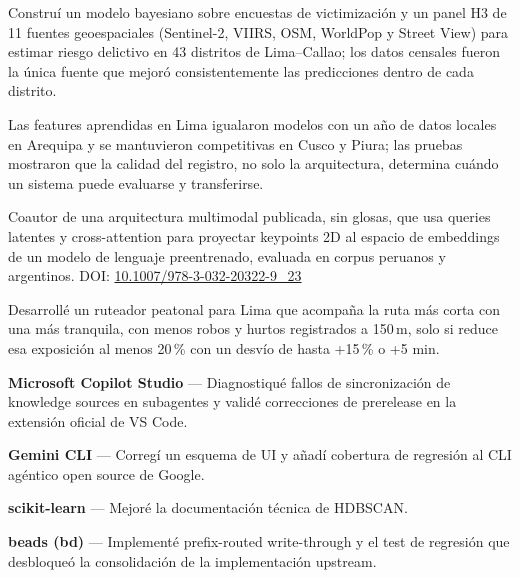 \documentclass[10pt,a4paper]{article}
\begin{document}
\begin{cvitems}
  \item {} Construí un modelo bayesiano sobre encuestas de victimización y un panel
  H3 de 11 fuentes geoespaciales (Sentinel-2, VIIRS, OSM, WorldPop y Street View) para estimar riesgo delictivo en 43
  distritos de Lima--Callao; los datos censales fueron la única fuente que mejoró consistentemente las predicciones
  dentro de cada distrito.
  \item {} Las features aprendidas en Lima igualaron modelos con un año de datos locales
  en Arequipa y se mantuvieron competitivas en Cusco y Piura; las pruebas mostraron que la calidad del registro, no solo
  la arquitectura, determina cuándo un sistema puede evaluarse y transferirse.
\end{cvitems}

\begin{cvitems}
  \item Coautor de una arquitectura multimodal publicada, sin glosas, que usa queries latentes y cross-attention para proyectar
  keypoints 2D al espacio de embeddings de un modelo de lenguaje preentrenado, evaluada en corpus peruanos y
  argentinos. DOI: \href{https://doi.org/10.1007/978-3-032-20322-9_23}{10.1007/978-3-032-20322-9\_23}
\end{cvitems}

\begin{cvitems}
  \item Desarrollé un ruteador peatonal para Lima que acompaña la ruta más corta con una más tranquila, con menos robos
  y hurtos registrados a 150\,m, solo si reduce esa exposición al menos 20\,\% con un desvío de hasta +15\,\% o +5 min.
\end{cvitems}

\begin{cvitems}
  \item \textbf{Microsoft Copilot Studio} --- Diagnostiqué fallos de sincronización de knowledge sources en subagentes y
  validé correcciones de prerelease en la extensión oficial de VS Code.
  \item \textbf{Gemini CLI} --- Corregí un esquema de UI y añadí cobertura de regresión al CLI agéntico open source de Google.
  \item \textbf{scikit-learn} --- Mejoré la documentación técnica de HDBSCAN.
  \item \textbf{beads (bd)} --- Implementé prefix-routed write-through y el test de regresión que desbloqueó la consolidación
  de la implementación upstream.
\end{cvitems}
\end{document}
